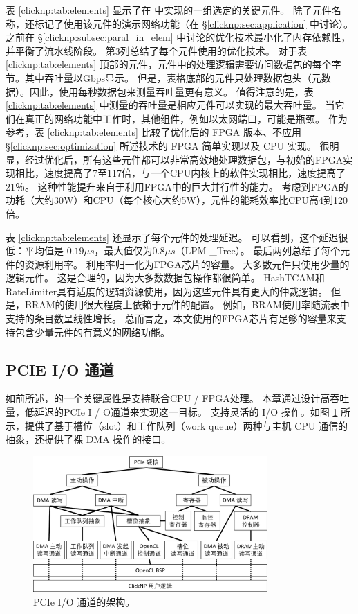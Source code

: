 表 \ref {clicknp:tab:elements} 显示了在 \name 中实现的一组选定的关键元件。
除了元件名称，还标记了使用该元件的演示网络功能（在 \S \ref {clicknp:sec:application} 中讨论）。
之前在 \S \ref {clicknp:subsec:paral_in_elem} 中讨论的优化技术最小化了内存依赖性，并平衡了流水线阶段。
第3列总结了每个元件使用的优化技术。
对于表 \ref {clicknp:tab:elements} 顶部的元件，元件中的处理逻辑需要访问数据包的每个字节。其中吞吐量以Gbps显示。
但是，表格底部的元件只处理数据包头（元数据）。因此，使用每秒数据包来测量吞吐量更有意义。
值得注意的是，表 \ref {clicknp:tab:elements} 中测量的吞吐量是相应元件可以实现的最大吞吐量。
当它们在真正的网络功能中工作时，其他组件，例如以太网端口，可能是瓶颈。
作为参考，表 \ref {clicknp:tab:elements} 比较了优化后的 FPGA 版本、不应用 \S\ref {clicknp:sec:optimization} 所述技术的 FPGA 简单实现以及 CPU 实现。
很明显，经过优化后，所有这些元件都可以非常高效地处理数据包，与初始的FPGA实现相比，速度提高了7至117倍，与一个CPU内核上的软件实现相比，速度提高了21％。
这种性能提升来自于利用FPGA中的巨大并行性的能力。
考虑到FPGA的功耗（大约30W）和CPU（每个核心大约5W），\name 元件的能耗效率比CPU高4到120倍。

表 \ref {clicknp:tab:elements} 还显示了每个元件的处理延迟。
可以看到，这个延迟很低：平均值是 $0.19 \mu s$，最大值仅为$0.8 \mu s$（LPM \_Tree）。
最后两列总结了每个元件的资源利用率。 利用率归一化为FPGA芯片的容量。
大多数元件只使用少量的逻辑元件。
这是合理的，因为大多数数据包操作都很简单。
HashTCAM和RateLimiter具有适度的逻辑资源使用，因为这些元件具有更大的仲裁逻辑。
但是，BRAM的使用很大程度上依赖于元件的配置。 例如，BRAM使用率随流表中支持的条目数呈线性增长。
总而言之，本文使用的FPGA芯片有足够的容量来支持包含少量元件的有意义的网络功能。


\subsection{PCIE I/O 通道}
\label{clicknp:subsec:pcie}

如前所述，\name 的一个关键属性是支持联合CPU / FPGA处理。
本章通过设计高吞吐量，低延迟的PCIe I / O通道来实现这一目标。
\name 支持灵活的 I/O 操作。如图 \ref{clicknp:fig:pcie-io} 所示，\name 提供了基于槽位（slot）和工作队列（work queue）两种与主机 CPU 通信的抽象，还提供了裸 DMA 操作的接口。


\begin{figure}[htbp]
	\centering
	\includegraphics[width=0.8\textwidth]{image/pcie-io}
	\caption{PCIe I/O 通道的架构。}
	\label{clicknp:fig:pcie-io}
\end{figure}


